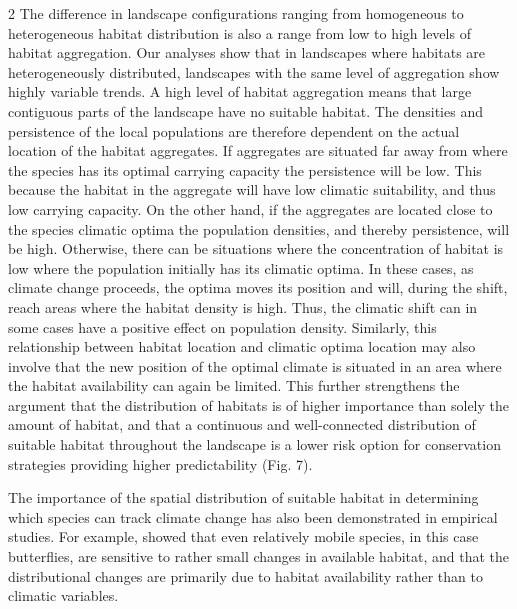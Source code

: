\documentclass[12pt,pdftex]{article}
\begin{document}
\begin{spacing}{2}
The difference in landscape configurations ranging from homogeneous to heterogeneous habitat distribution is also a range from low to high levels of habitat aggregation. Our analyses show that in landscapes where habitats are heterogeneously distributed, landscapes with the same level of aggregation show highly variable trends. A high level of habitat aggregation means that large contiguous parts of the landscape have no suitable habitat. The densities and persistence of the local populations are therefore dependent on the actual location of the habitat aggregates. If aggregates are situated far away from where the species has its optimal carrying capacity the persistence will be low. This because the habitat in the aggregate will have low climatic suitability, and thus low carrying capacity. On the other hand, if the aggregates are located close to the species climatic optima the population densities, and thereby persistence, will be high. Otherwise, there can be situations where the concentration of habitat is low where the population initially has its climatic optima. In these cases, as climate change proceeds, the optima moves its position and will, during the shift, reach areas where the habitat density is high. Thus, the climatic shift can in some cases have a positive effect on population density. Similarly, this relationship between habitat location and climatic optima location may also involve that the new position of the optimal climate is situated in an area where the habitat availability can again be limited. This further strengthens the argument that the distribution of habitats is of higher importance than solely the amount of habitat, and that a continuous and well-connected distribution of suitable habitat throughout the landscape is a lower risk option for conservation strategies providing higher predictability (Fig. 7).


The importance of the spatial distribution of suitable habitat in determining which species can track climate change has also been demonstrated in empirical studies. For example,  \cite{Hill2001} showed that even relatively mobile species, in this case butterflies, are sensitive to rather small changes in available habitat, and that the distributional changes are primarily due to habitat availability rather than to climatic variables.


\end{spacing}
\end{document}
